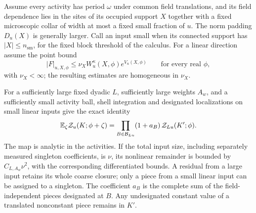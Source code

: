\begin{proposition}\label{prop:local-map}
Assume every activity has period \(\omega\) under common field translations,
and its field dependence lies in the sites of its occupied support
\(X\) together with a fixed microscopic collar of width at most a
fixed small fraction of \(u\).  The norm padding
\(D_u(X)\) is generally larger.  Call an input small when its connected
support has \(|X|\le n_{\mathrm{sm}}\), for the fixed block threshold
of the calculus.  For a linear direction assume the point bound
\[
 |F|_{u,X,\phi}\le
 \nu_X W_u^\kappa(X,\phi)e^{V_u(X,\phi)}
 \qquad\text{for every real }\phi,
\]
with \(\nu_X<\infty\); the resulting estimates are homogeneous in
\(\nu_X\).

For a sufficiently large fixed dyadic \(L\), sufficiently large
weights \(A_w\), and a sufficiently small activity ball, shell
integration and designated localizations on small linear inputs give
the exact identity
\begin{equation}\label{eq:exact-local-map}
 \mathbb E_\zeta\mathcal Z_u(K;\phi+\zeta)
 =\prod_{B\in\mathcal B_{Lu}}(1+a_B)\,
        \mathcal Z_{Lu}(K';\phi).
\end{equation}
The map is analytic in the activities.  If the total input size,
including separately measured singleton coefficients, is \(\nu\),
its nonlinear remainder is bounded by \(C_{L,A_w}\nu^2\), with the
corresponding differentiated bounds.  A residual from a large input retains its whole coarse
closure; only a piece from a small linear input can be assigned to a
singleton.  The coefficient \(a_B\) is the complete sum of the
field-independent pieces designated at \(B\).  Any undesignated
constant value of a translated nonconstant piece remains in \(K'\).


\end{proposition}
